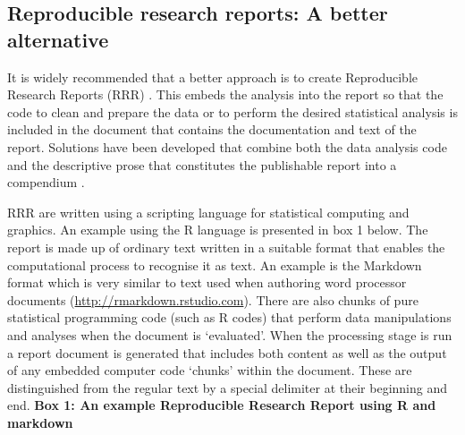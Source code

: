 \documentclass[11pt,a4paper]{article}
\begin{document}
\subsection{Reproducible research reports: A better alternative}

It is widely recommended that a better approach is to create Reproducible Research Reports (RRR) \citep{Healy2013}.  This embeds the analysis into the report so that the code to clean and prepare the data or to perform the desired statistical analysis is included in the document that contains the documentation and text of the report. Solutions have been developed that combine both the data analysis code
and the descriptive prose that constitutes the publishable report into
a compendium \citep{Gentleman2004,Schulte}.  

RRR are written using a scripting language for
statistical computing and graphics. An example using the R language is presented in box 1 below. The report is made up of ordinary
text written in a suitable format that enables the computational process
to recognise it as text. An example is the Markdown format which is
very similar to text used when authoring word processor documents
(\url{http://rmarkdown.rstudio.com}). There are also chunks of pure
statistical programming code (such as R codes) that perform data
manipulations and analyses when the document is `evaluated'. When the
processing stage is run a report document is generated that includes
both content as well as the output of any embedded computer code
`chunks' within the document. These are distinguished from the regular text by a special delimiter at their beginning and end. 
\clearpage
\textbf{Box 1: An example Reproducible Research Report using R and markdown}
\end{document}
